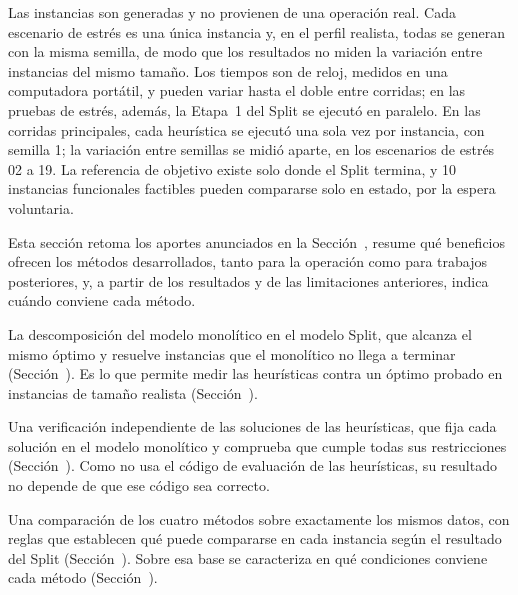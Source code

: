 \stopsubsubsection

\stopsubsection

\startsubsection[title={De la experimentación}]

Las instancias son generadas y no provienen de
una operación real. Cada escenario de estrés es una única instancia y, en el
perfil realista, todas se generan con la misma semilla, de modo que los
resultados no miden la variación entre instancias del mismo tamaño. Los tiempos son de reloj, medidos en una computadora
portátil, y pueden variar hasta el doble entre corridas; en las pruebas de
estrés, además, la Etapa~1 del Split se ejecutó en paralelo. En las corridas
principales, cada heurística se ejecutó una sola vez por instancia, con
semilla 1; la variación entre semillas se midió aparte, en los escenarios de
estrés 02 a 19. La referencia de
objetivo existe solo donde el Split termina, y 10 instancias funcionales
factibles pueden compararse solo en estado, por la espera voluntaria.

\stopsubsection

\stopsection

\startsection[title={Aportes y recomendaciones}, reference=sec:aportes]

Esta sección retoma los aportes anunciados en la Sección~,
resume qué beneficios ofrecen los métodos desarrollados, tanto para la
operación como para trabajos posteriores, y, a partir de los resultados y de
las limitaciones anteriores, indica cuándo conviene cada método.

\startsubsection[title={Aportes}, reference=sec:aportes_lista]

\startitemize[n]
	\item La descomposición del modelo monolítico en el modelo Split, que
	alcanza el mismo óptimo y resuelve instancias que el monolítico no llega a
	terminar (Sección~). Es lo que permite medir
	las heurísticas contra un óptimo probado en instancias de tamaño realista
	(Sección~).
	\item Una verificación independiente de las soluciones de las heurísticas,
	que fija cada solución en el modelo monolítico y comprueba que cumple todas
	sus restricciones (Sección~). Como no usa el código de
	evaluación de las heurísticas, su resultado no depende de que ese código
	sea correcto.
	\item Una comparación de los cuatro métodos sobre exactamente los mismos
	datos, con reglas que establecen qué puede compararse en cada instancia
	según el resultado del Split (Sección~). Sobre esa
	base se caracteriza en qué condiciones conviene cada método
	(Sección~).
\stopitemize

